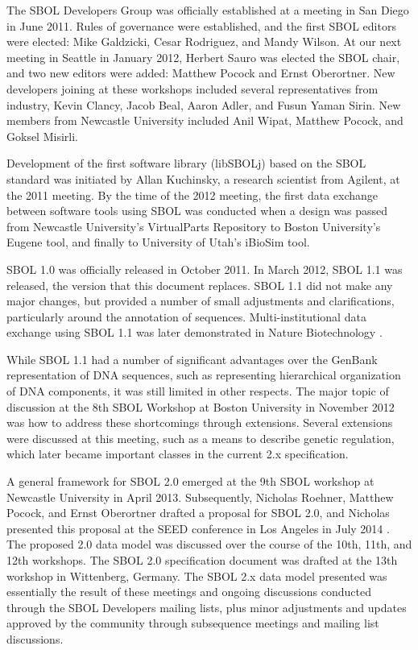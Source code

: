The SBOL Developers Group was officially established at a meeting in San Diego in June 2011.  Rules of governance were established, and the first SBOL editors were elected: Mike Galdzicki, Cesar Rodriguez, and Mandy Wilson. At our next meeting in Seattle in January 2012, Herbert Sauro was elected the SBOL chair, and two new editors were added: Matthew Pocock and Ernst Oberortner.  New developers joining at these workshops included several representatives from industry, Kevin Clancy, Jacob Beal, Aaron Adler, and Fusun Yaman Sirin. New members from Newcastle University included Anil Wipat, Matthew Pocock, and Goksel Misirli.

Development of the first software library (libSBOLj) based on the SBOL standard was initiated by Allan Kuchinsky, a research scientist from Agilent, at the 2011 meeting.  By the time of the 2012 meeting, the first data exchange between software tools using SBOL was conducted when a design was passed from Newcastle University's VirtualParts Repository to Boston University's Eugene tool, and finally to University of Utah's iBioSim tool. 

SBOL 1.0 was officially released in October 2011.  In March 2012, SBOL 1.1 was released, the version that this document replaces. SBOL 1.1 did not make any major changes, but provided a number of small adjustments and clarifications, particularly around the annotation of sequences.  Multi-institutional data exchange using SBOL 1.1 was later demonstrated in Nature Biotechnology \cite{galdzicki2014synthetic}. 

While SBOL 1.1 had a number of significant advantages over the GenBank representation of DNA sequences, such as representing hierarchical organization of DNA components, it was still limited in other respects. The major topic of discussion at the 8th SBOL Workshop at Boston University in November 2012 was how to address these shortcomings through extensions.  Several extensions were discussed at this meeting, such as a means to describe genetic regulation, which later became important classes in the current 2.x specification.  

A general framework for SBOL 2.0 emerged at the 9th SBOL workshop at Newcastle University in April 2013.  Subsequently, Nicholas Roehner, Matthew Pocock, and Ernst Oberortner drafted a proposal for SBOL 2.0, and Nicholas presented this proposal at the SEED conference in Los Angeles in July 2014 \cite{roehner2014proposed}.  The proposed 2.0 data model was discussed over the course of the 10th, 11th, and 12th workshops.  
The SBOL 2.0 specification document was drafted at the 13th workshop in Wittenberg, Germany. The SBOL 2.x data model presented was essentially the result of these meetings and ongoing discussions conducted through the SBOL Developers mailing lists, plus minor adjustments and updates approved by the community through subsequence meetings and mailing list discussions.

